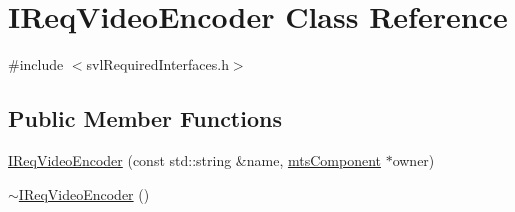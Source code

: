 \hypertarget{class_i_req_video_encoder}{}\section{I\+Req\+Video\+Encoder Class Reference}
\label{class_i_req_video_encoder}


{\ttfamily \#include $<$svl\+Required\+Interfaces.\+h$>$}

\subsection*{Public Member Functions}
\begin{DoxyCompactItemize}
\item 
\hyperlink{class_i_req_video_encoder_ac49a7c628d6cab4933bf34d25365440c}{I\+Req\+Video\+Encoder} (const std\+::string \&name, \hyperlink{classmts_component}{mts\+Component} $\ast$owner)
\item 
\hyperlink{class_i_req_video_encoder_a37df3c177575f1547ae7e83f99da6884}{$\sim$\+I\+Req\+Video\+Encoder} ()
\end{DoxyCompactItemize}
